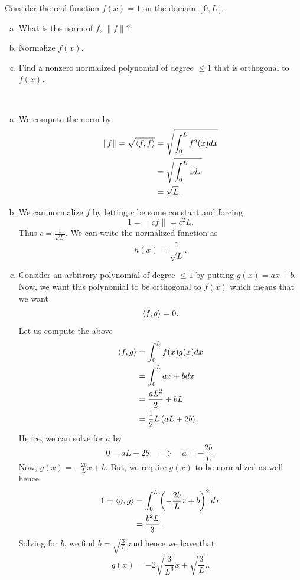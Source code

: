 \documentclass[12pt]{article} %
\begin{document}
\newpage
\begin{problem}
	Consider the real function $f(x)=1$ on the domain $[0,L]$.
	\begin{enumerate}[(a)]
		\item What is the norm of $f$, $\|f\|$?
		\item Normalize $f(x)$.
		\item Find a nonzero normalized polynomial of degree $\leq 1$ that is orthogonal to $f(x)$.
	\end{enumerate}
\end{problem}
\begin{solution}~
	\begin{enumerate}[(a)]
		\item We compute the norm by
		\begin{align*}
			\|f\| = \sqrt{\left\langle f, f \right\rangle} &=\sqrt{ \int_0^L f^2(x)dx}\\
			&=\sqrt{ \int_0^L 1 dx}\\
			&= \sqrt{L}.
		\end{align*}
		\item We can normalize $f$ by letting $c$ be some constant and forcing
		\[
		1=\|cf\| = c^2L.
		\]
		Thus $c=\frac{1}{\sqrt{L}}$.  We can write the normalized function as
		\[
		h(x)=\frac{1}{\sqrt{L}}. 
		\]
		\item Consider an arbitrary polynomial of degree $\leq 1$ by putting $g(x)=ax+b$.  Now, we want this polynomial to be orthogonal to $f(x)$ which means that we want
		\[
		\left\langle f, g \right\rangle=0.
		\]
		Let us compute the above
		\begin{align*}
			\left\langle f, g \right\rangle &= \int_0^L f(x)g(x)dx\\
			&=\int_0^L ax+bdx\\
			&= \frac{aL^2}{2}+bL\\
			&= \frac{1}{2}L\left(aL+2b\right).
		\end{align*}
		Hence, we can solve for $a$ by
		\[
		0=aL+2b \quad \implies \quad a= -\frac{2b}{L}.
		\]
		Now, $g(x)=-\frac{2b}{L}x+b$.  But, we require $g(x)$ to be normalized as well hence
		\begin{align*}
			1=\left\langle g, g \right\rangle &= \int_0^L \left(-\frac{2b}{L}x+b\right)^2dx\\
			&= \frac{b^2L}{3}.
		\end{align*}
		Solving for $b$, we find $b=\sqrt{\frac{3}{L}}$ and hence we have that
		\[
		g(x) = -2\sqrt{\frac{3}{L^3}}x+\sqrt{\frac{3}{L}}..
		\]
	\end{enumerate}
\end{solution}
\end{document}
